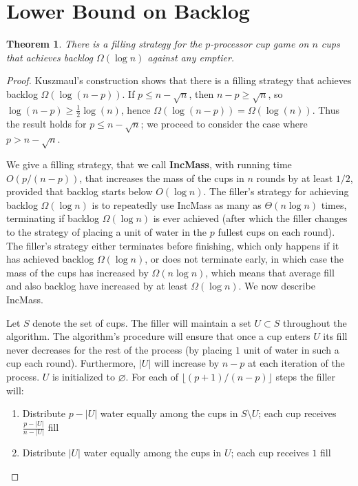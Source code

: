 \documentclass[twocolumn,11pt]{article}
\newtheorem{theorem}{Theorem}
\begin{document}
\section{Lower Bound on Backlog}
\begin{theorem}
  There is a filling strategy for the $p$-processor cup game on
  $n$ cups that achieves backlog $\Omega(\log n)$ against any emptier.
\end{theorem}
\begin{proof}
Kuszmaul's construction shows that there is a filling strategy
that achieves backlog $\Omega(\log (n-p))$.  If $p \le n -
\sqrt{n}$, then $n-p \ge \sqrt{n}$, so $\log (n-p) \ge
\frac{1}{2}\log (n)$, hence $\Omega(\log(n-p)) =
\Omega(\log(n))$. Thus the result holds for $p \le n - \sqrt{n}$;
we proceed to consider the case where $p > n-\sqrt{n}$.

We give a filling strategy, that we call \textbf{IncMass}, with
running time $O(p/(n-p))$, that increases the mass of the cups in
$n$ rounds by at least $1/2$, provided that backlog starts below
$O(\log n)$. The filler's strategy for achieving backlog
$\Omega(\log n)$ is to repeatedly use IncMass as many as
$\Theta(n\log n)$ times, terminating if backlog $\Omega(\log n)$
is ever achieved (after which the filler changes to the strategy
of placing a unit of water in the $p$ fullest cups on each
round). The filler's strategy either terminates before finishing,
which only happens if it has achieved backlog $\Omega(\log n)$,
or does not terminate early, in which case the mass of the cups
has increased by $\Omega(n\log n)$, which means
that average fill and also backlog have increased by at least
$\Omega(\log n)$. We now describe IncMass.

Let $S$ denote the set of cups. The filler will maintain a set $U
\subset S$ throughout the algorithm. The algorithm's procedure
will ensure that once a cup enters $U$ its fill never decreases
for the rest of the process (by placing $1$ unit of water in such
a cup each round). Furthermore, $|U|$ will increase by $n-p$ at
each iteration of the process. $U$ is initialized to $\varnothing$.
For each of $\lfloor(p+1) / (n-p)\rfloor$ steps the filler will:
\begin{enumerate}
  \item Distribute $p - |U|$ water equally among the cups in
    $S\setminus U$; each cup receives
    $\frac{p-|U|}{n-|U|}$ fill
  \item Distribute $|U|$ water equally among the cups in $U$;
    each cup receives $1$ fill
\end{enumerate}


\end{proof}
\end{document}
